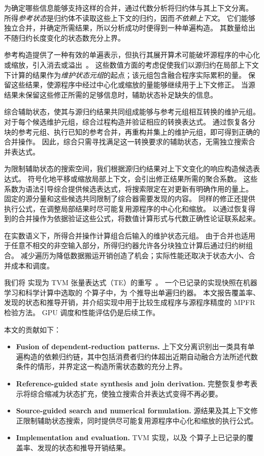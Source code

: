 为确定哪些信息能够支持这样的合并，\sys 通过代数分析将归约体与其上下文分离。
所得\emph{参考状态}是归约体不读取这些上下文的归约，因而\emph{不依赖上下文}。
它们能够独立合并，并确定所需结果，所以分析成功时便得到一种单遍构造。
其数量给出不随归约长度变化的状态数充分上界。

参考构造提供了一种有效的单遍表示，但执行其展开算术可能破坏源程序的中心化或缩放，引入消去或溢出~\citep{chan,blanchard,boldo_fp}。
这些数值方面的考虑促使我们以源归约在局部上下文下计算的结果作为\emph{维护状态元组}的起点；该元组包含融合程序实际累积的量。
保留这些结果，使源程序中经过中心化或缩放的量能够继续用于上下文修正。
当源结果未保留这些修正所需的足够信息时，辅助状态补足缺失的信息。

\sys 综合辅助状态，使其与源归约结果共同组成能够与参考元组相互转换的维护元组。
对于每个候选维护元组，综合过程构造并验证相应的转换表达式。
通过恢复各分块的参考元组、执行已知的参考合并，再重构并集上的维护元组，即可得到正确的合并操作。
因此，综合只需寻找满足这一转换要求的辅助状态，无需独立搜索合并表达式。

为限制辅助状态的搜索空间，我们根据源归约结果对上下文变化的响应构造候选表达式。
符号化地平移或缩放局部上下文，会引出修正结果所需的聚合系数。
这些系数为语法引导综合提供候选表达式，将搜索限定在对更新有明确作用的量上。
固定的源分量和这些候选共同限制了综合器需要发现的内容。
同样的修正还提供执行公式，在调整局部结果时尽可能复用源程序的中心化和缩放。
以通过恢复得到的合并操作为依据验证这些公式，将数值计算形式与代数正确性论证联系起来。

在实数语义下，所得合并操作计算组合后输入的维护状态元组。
由于合并也适用于任意不相交的非空输入部分，所得归约器允许各分块独立计算后通过归约树组合。
减少遍历为降低数据搬运开销创造了机会；实际性能还取决于状态大小、合并成本和调度。

我们将 \sys 实现为 TVM 张量表达式（TE）的重写~\citep{tvm}。
一个已记录的实现快照在机器学习和科学计算中选取的 \nShowcase 个算子中，为 \nShowFused 个推导出单遍归约器。
本文报告覆盖率、发现的状态和推导开销，并介绍实现中用于比较生成程序与源程序精度的 MPFR 检验方法。
GPU 调度和性能评估仍是后续工作。

\noindent 本文的贡献如下：
\begin{itemize}
\item \textbf{Fusion of dependent-reduction patterns.}
上下文分离识别出一类具有单遍构造的依赖归约链，其中包括消费者归约体超出近期自动融合方法所述代数条件的情形，并界定这一构造所需状态数的充分上界。
\item \textbf{Reference-guided state synthesis and join derivation.}
完整恢复参考表示将综合缩减为状态扩充，使独立搜索合并表达式变得不再必要。
\item \textbf{Source-guided search and numerical formulation.}
源结果及其上下文修正限制辅助状态搜索，同时提供尽可能复用源程序中心化和缩放的执行公式。
\item \textbf{Implementation and evaluation.}
TVM 实现，以及 \nShowcase 个算子上已记录的覆盖率、发现的状态和推导开销结果。
\end{itemize}
